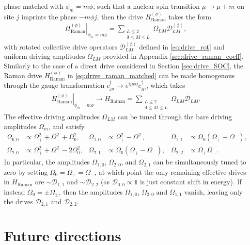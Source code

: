 \documentclass[nofootinbib,notitlepage,11pt]{revtex4-2}
\renewcommand{\t}{\text} %
\newcommand{\p}[1]{\left(#1\right)} %
\newcommand{\1}{\mathds{1}}
\newcommand{\D}{\mathcal{D}}
\begin{document}
phase-matched with $\phi_m=m\phi$, such that a nuclear spin transition
$\mu\to\mu+m$ on site $j$ imprints the phase $-m\phi j$, then the
drive $H_{\t{Raman}}^{(\phi)}$ takes the form
\begin{align}
  \left. H_{\t{Raman}}^{(\phi)} \right|_{\phi_m=m\phi}
  = \sum_{\substack{L\le2\\0\le M\le L}} \Omega_{LM} \D_{LM}^{(\phi)},
  \label{eq:drive_raman_matched}
\end{align}
with rotated collective drive operators $\D_{LM}^{(\phi)}$ defined in
\eqref{eq:drive_rot} and uniform driving amplitudes $\Omega_{LM}$
provided in Appendix \ref{sec:drive_raman_coeff}.  Similarly to the
case of a direct drive considered in Section \ref{sec:drive_SOC}, the
Raman drive $H_{\t{Raman}}^{(\phi)}$ in \eqref{eq:drive_raman_matched}
can be made homogenous through the gauge transformation
$c_{j\mu}^\dag \to e^{i\mu\phi j} c_{j\mu}^\dag$, which takes
\begin{align}
  \left. H_{\t{Raman}}^{(\phi)} \right|_{\phi_m=m\phi}
  \to H_{\t{Raman}}
  = \sum_{\substack{L\le2\\0\le M\le L}} \Omega_{LM} \D_{LM}.
\end{align}
The effective driving amplitudes $\Omega_{LM}$ can be tuned through
the bare driving amplitudes $\Omega_m$, and satisfy
\begin{align}
  \Omega_{0,0} &\propto \Omega_+^2 + \Omega_-^2 + \Omega_0^2,
  &
  \Omega_{1,0} &\propto \Omega_+^2 - \Omega_-^2,
  &
  \Omega_{1,1} &\propto \Omega_0 \p{\Omega_+ + \Omega_-}, \\
  \Omega_{2,0} &\propto \Omega_+^2 + \Omega_-^2 - 2\Omega_0^2,
  &
  \Omega_{2,1} &\propto \Omega_0 \p{\Omega_+ - \Omega_-},
  &
  \Omega_{2,2} &\propto \Omega_+ \Omega_-.
\end{align}
In particular, the amplitudes $\Omega_{1,0}$, $\Omega_{2,0}$, and
$\Omega_{2,1}$ can be simultaneously tuned to zero by setting
$\Omega_0=\Omega_+=\Omega_-$, at which point the only remaining
effective drives in $H_{\t{Raman}}$ are $\sim\D_{1,1}$ and
$\sim\D_{2,2}$ (as $\D_{0,0}\propto\1$ is just constant shift in
energy).  If instead $\Omega_0=\pm\Omega_\pm$, then the amplitudes
$\Omega_{1,0}$, $\Omega_{2,0}$ and $\Omega_{1,1}$ vanish, leaving only
the drives $\D_{2,1}$ and $\D_{2,2}$.

\section{Future directions}
\end{document}
